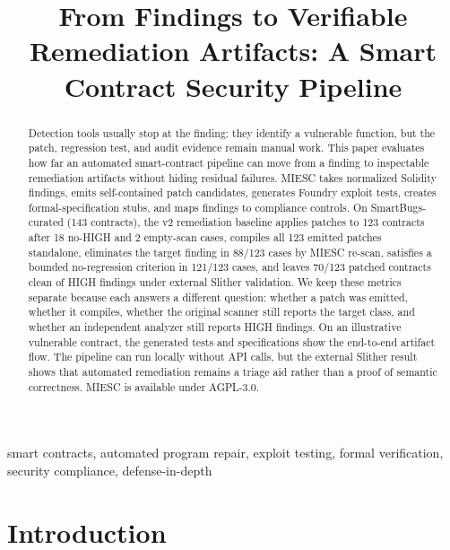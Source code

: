 \documentclass[conference]{IEEEtran}
\begin{document}
\title{From Findings to Verifiable Remediation Artifacts: A Smart Contract Security Pipeline}

\author{
}

\maketitle

\begin{abstract}
Detection tools usually stop at the finding: they identify a vulnerable function, but the patch, regression test, and audit evidence remain manual work. This paper evaluates how far an automated smart-contract pipeline can move from a finding to inspectable remediation artifacts without hiding residual failures. MIESC takes normalized Solidity findings, emits self-contained patch candidates, generates Foundry exploit tests, creates formal-specification stubs, and maps findings to compliance controls. On SmartBugs-curated (143 contracts), the v2 remediation baseline applies patches to 123 contracts after 18 no-HIGH and 2 empty-scan cases, compiles all 123 emitted patches standalone, eliminates the target finding in 88/123 cases by MIESC re-scan, satisfies a bounded no-regression criterion in 121/123 cases, and leaves 70/123 patched contracts clean of HIGH findings under external Slither validation. We keep these metrics separate because each answers a different question: whether a patch was emitted, whether it compiles, whether the original scanner still reports the target class, and whether an independent analyzer still reports HIGH findings. On an illustrative vulnerable contract, the generated tests and specifications show the end-to-end artifact flow. The pipeline can run locally without API calls, but the external Slither result shows that automated remediation remains a triage aid rather than a proof of semantic correctness. MIESC is available under AGPL-3.0.
\end{abstract}

\begin{IEEEkeywords}
smart contracts, automated program repair, exploit testing, formal verification, security compliance, defense-in-depth
\end{IEEEkeywords}

\section{Introduction}
\end{document}
